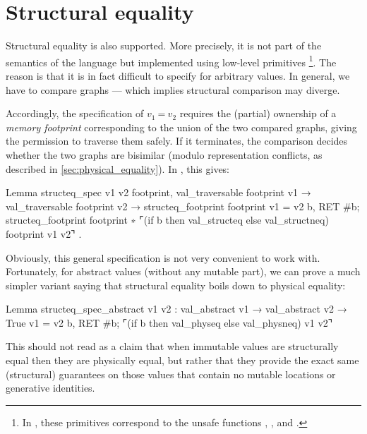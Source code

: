 \section{Structural equality}
\label{sec:structural_equality}

Structural equality is also supported.
More precisely, it is not part of the semantics of the language but implemented using low-level primitives%
\footnote{
In \OCaml, these primitives correspond to the unsafe functions , ,  and .
}.
The reason is that it is in fact difficult to specify for arbitrary values.
In general, we have to compare graphs --- which implies structural comparison may diverge.

Accordingly, the specification of $v_1\ \texttt{=}\ v_2$ requires the (partial) ownership of a \emph{memory footprint} corresponding to the union of the two compared graphs, giving the permission to traverse them safely.
If it terminates, the comparison decides whether the two graphs are bisimilar (modulo representation conflicts, as described in \cref{sec:physical_equality}).
In \Iris, this gives:

\begin{coqcode}
Lemma structeq_spec v1 v2 footprint,
  val_traversable footprint v1 →
  val_traversable footprint v2 →
  {{{ structeq_footprint footprint }}}
    v1 = v2
  {{{ b, RET #b;
      structeq_footprint footprint ∗
      ⌜(if b then val_structeq else val_structneq) footprint v1 v2⌝ }}}.
\end{coqcode}

Obviously, this general specification is not very convenient to work with.
Fortunately, for abstract values (without any mutable part), we can prove a much simpler variant saying that structural equality boils down to physical equality:

\begin{coqcode}
Lemma structeq_spec_abstract v1 v2 :
  val_abstract v1 →
  val_abstract v2 →
  {{{ True }}}
    v1 = v2
  {{{ b, RET #b; ⌜(if b then val_physeq else val_physneq) v1 v2⌝ }}}
\end{coqcode}
This should not read as a claim that when immutable values are structurally equal then they are physically equal, but rather that they provide the exact same (structural) guarantees on those values that contain no mutable locations or generative identities.

